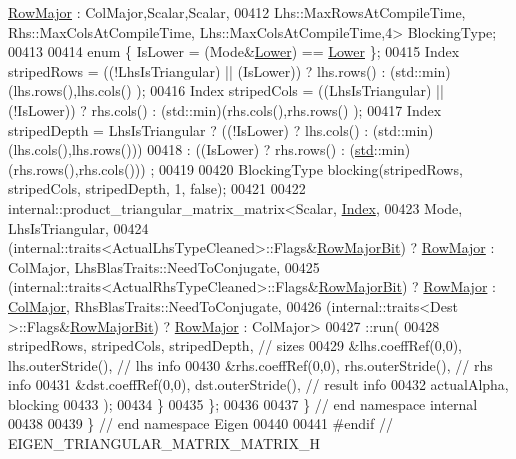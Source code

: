 \begin{DoxyCode}
      \hyperlink{group__enums_ggaacded1a18ae58b0f554751f6cdf9eb13acfcde9cd8677c5f7caf6bd603666aae3}{RowMajor} : ColMajor,Scalar,Scalar,
00412               Lhs::MaxRowsAtCompileTime, Rhs::MaxColsAtCompileTime, Lhs::MaxColsAtCompileTime,4> 
      BlockingType;
00413 
00414     \textcolor{keyword}{enum} \{ IsLower = (Mode&\hyperlink{group__enums_gga39e3366ff5554d731e7dc8bb642f83cda891792b8ed394f7607ab16dd716f60e6}{Lower}) == \hyperlink{group__enums_gga39e3366ff5554d731e7dc8bb642f83cda891792b8ed394f7607ab16dd716f60e6}{Lower} \};
00415     Index stripedRows  = ((!LhsIsTriangular) || (IsLower))  ? lhs.rows() : (std::min)(lhs.rows(),lhs.cols()
      );
00416     Index stripedCols  = ((LhsIsTriangular)  || (!IsLower)) ? rhs.cols() : (std::min)(rhs.cols(),rhs.rows()
      );
00417     Index stripedDepth = LhsIsTriangular ? ((!IsLower) ? lhs.cols() : (std::min)(lhs.cols(),lhs.rows()))
00418                                          : ((IsLower)  ? rhs.rows() : (\hyperlink{namespacestd}{std}::min)(rhs.rows(),rhs.cols()))
      ;
00419 
00420     BlockingType blocking(stripedRows, stripedCols, stripedDepth, 1, \textcolor{keyword}{false});
00421 
00422     internal::product\_triangular\_matrix\_matrix<Scalar, \hyperlink{namespace_eigen_a62e77e0933482dafde8fe197d9a2cfde}{Index},
00423       Mode, LhsIsTriangular,
00424       (internal::traits<ActualLhsTypeCleaned>::Flags&\hyperlink{group__flags_gae4f56c2a60bbe4bd2e44c5b19cbe8762}{RowMajorBit}) ? 
      \hyperlink{group__enums_ggaacded1a18ae58b0f554751f6cdf9eb13acfcde9cd8677c5f7caf6bd603666aae3}{RowMajor} : ColMajor, LhsBlasTraits::NeedToConjugate,
00425       (internal::traits<ActualRhsTypeCleaned>::Flags&\hyperlink{group__flags_gae4f56c2a60bbe4bd2e44c5b19cbe8762}{RowMajorBit}) ? 
      \hyperlink{group__enums_ggaacded1a18ae58b0f554751f6cdf9eb13acfcde9cd8677c5f7caf6bd603666aae3}{RowMajor} : \hyperlink{group__enums_ggaacded1a18ae58b0f554751f6cdf9eb13a0cbd4bdd0abcfc0224c5fcb5e4f6669a}{ColMajor}, RhsBlasTraits::NeedToConjugate,
00426       (internal::traits<Dest          >::Flags&\hyperlink{group__flags_gae4f56c2a60bbe4bd2e44c5b19cbe8762}{RowMajorBit}) ? 
      \hyperlink{group__enums_ggaacded1a18ae58b0f554751f6cdf9eb13acfcde9cd8677c5f7caf6bd603666aae3}{RowMajor} : ColMajor>
00427       ::run(
00428         stripedRows, stripedCols, stripedDepth,   \textcolor{comment}{// sizes}
00429         &lhs.coeffRef(0,0), lhs.outerStride(),    \textcolor{comment}{// lhs info}
00430         &rhs.coeffRef(0,0), rhs.outerStride(),    \textcolor{comment}{// rhs info}
00431         &dst.coeffRef(0,0), dst.outerStride(),    \textcolor{comment}{// result info}
00432         actualAlpha, blocking
00433       );
00434   \}
00435 \};
00436 
00437 \} \textcolor{comment}{// end namespace internal}
00438 
00439 \} \textcolor{comment}{// end namespace Eigen}
00440 
00441 \textcolor{preprocessor}{#endif // EIGEN\_TRIANGULAR\_MATRIX\_MATRIX\_H}
\end{DoxyCode}
